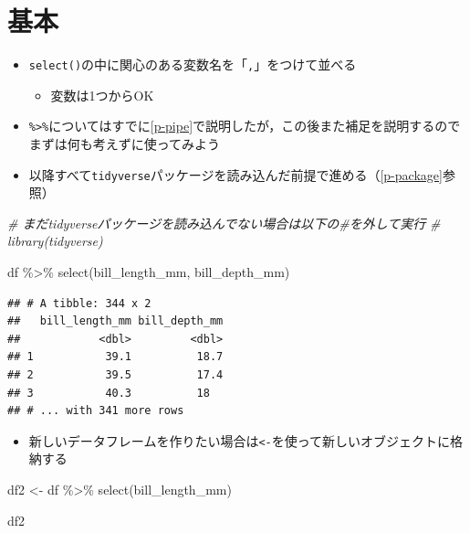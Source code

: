 \documentclass[
  xelatex,ja=standard, b5paper]{bxjsbook}
\newenvironment{Shaded}{\begin{snugshade}}{\end{snugshade}}
\newcommand{\CommentTok}[1]{\textcolor[rgb]{0.56,0.35,0.01}{\textit{#1}}}
\newcommand{\FunctionTok}[1]{\textcolor[rgb]{0.00,0.00,0.00}{#1}}
\newcommand{\NormalTok}[1]{#1}
\newcommand{\OtherTok}[1]{\textcolor[rgb]{0.56,0.35,0.01}{#1}}
\newcommand{\SpecialCharTok}[1]{\textcolor[rgb]{0.00,0.00,0.00}{#1}}
\providecommand{\tightlist}{%
  \setlength{\itemsep}{0pt}\setlength{\parskip}{0pt}}
\begin{document}
\hypertarget{select-standard}{%
\section{基本}\label{select-standard}}

\begin{itemize}
\tightlist
\item
  \texttt{select()}の中に関心のある変数名を「\texttt{,}」をつけて並べる

  \begin{itemize}
  \tightlist
  \item
    変数は1つからOK
  \end{itemize}
\item
  \texttt{\%\textgreater{}\%}についてはすでに\ref{p-pipe}で説明したが，この後また補足を説明するのでまずは何も考えずに使ってみよう
\item
  以降すべて\texttt{tidyverse}パッケージを読み込んだ前提で進める（\ref{p-package}参照）
\end{itemize}

\begin{Shaded}
\begin{Highlighting}[]
\CommentTok{\# まだtidyverseパッケージを読み込んでない場合は以下の\#を外して実行}
\CommentTok{\# library(tidyverse)}

\NormalTok{df }\SpecialCharTok{\%\textgreater{}\%} 
  \FunctionTok{select}\NormalTok{(bill\_length\_mm, bill\_depth\_mm)}
\end{Highlighting}
\end{Shaded}

\begin{verbatim}
## # A tibble: 344 x 2
##   bill_length_mm bill_depth_mm
##            <dbl>         <dbl>
## 1           39.1          18.7
## 2           39.5          17.4
## 3           40.3          18  
## # ... with 341 more rows
\end{verbatim}

\begin{itemize}
\tightlist
\item
  新しいデータフレームを作りたい場合は\texttt{\textless{}-}を使って新しいオブジェクトに格納する
\end{itemize}

\begin{Shaded}
\begin{Highlighting}[]
\NormalTok{df2 }\OtherTok{\textless{}{-}} 
\NormalTok{  df }\SpecialCharTok{\%\textgreater{}\%} \FunctionTok{select}\NormalTok{(bill\_length\_mm)}

\NormalTok{df2}
\end{Highlighting}
\end{Shaded}
\end{document}
